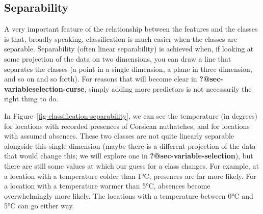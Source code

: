 \documentclass[
  letterpaper,
]{scrbook}
\begin{document}
\subsection{Separability}\label{separability}

A very important feature of the relationship between the features and
the classes is that, broadly speaking, classification is much easier
when the classes are separable. Separability (often linear separability)
is achieved when, if looking at some projection of the data on two
dimensions, you can draw a line that separates the classes (a point in a
single dimension, a plane in three dimension, and so on and so forth).
For reasons that will become clear in
\textbf{?@sec-variableselection-curse}, simply adding more predictors is
not necessarily the right thing to do.

In Figure~\ref{fig-classification-separability}, we can see the
temperature (in degrees) for locations with recorded presences of
Corsican nuthatches, and for locations with assumed absences. These two
classes are not quite linearly separable alongside this single dimension
(maybe there is a different projection of the data that would change
this; we will explore one in \textbf{?@sec-variable-selection}), but
there are still some values at which our guess for a class changes. For
example, at a location with a temperature colder than 1°C, presences are
far more likely. For a location with a temperature warmer than 5°C,
absences become overwhelmingly more likely. The locations with a
temperature between 0°C and 5°C can go either way.

{
\makeatletter
\def\LT@makecaption#1#2#3{%
  \noalign{\smash{\hbox{\kern\textwidth\rlap{\kern\marginparsep
  \parbox[t]{\marginparwidth}{%
    \footnotesize{%
      \vspace{(1.1\baselineskip)}
    #1{#2: }\ignorespaces #3}}}}}}%
    }
\makeatother

\begin{figure}[bt]



\end{figure}%

}
\end{document}
